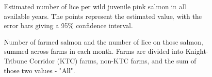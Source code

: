 \documentclass{article}
\begin{document}
\begin{figure}[h]
    \centering
    \caption{Estimated number of lice per wild juvenile pink salmon in all available years. The points represent the estimated value, with the error bars giving a 95\% confidence interval.}
    \label{fig:wild-lice}
\end{figure} 

\begin{figure}[h]
    \centering
    \caption{Number of farmed salmon and the number of lice on those salmon, summed across farms in each month. Farms are divided into Knight-Tribune Corridor (KTC) farms, non-KTC farms, and the sum of those two values - "All".}
    \label{fig:timeseries}
\end{figure} 
\end{document}
